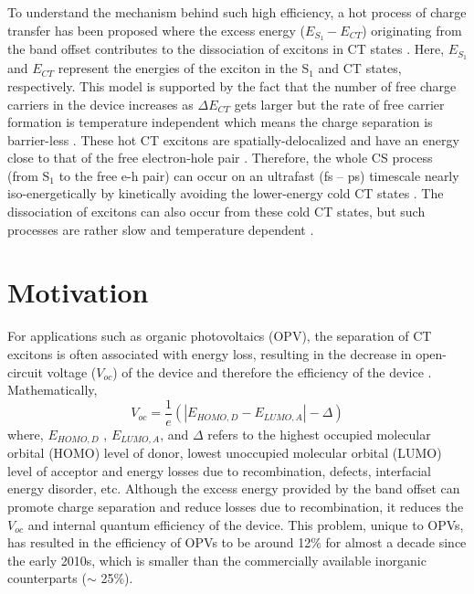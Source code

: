 \documentclass[12pt]{article}
\begin{document}
To understand the mechanism behind such high efficiency, a hot process of charge transfer has been proposed where the excess energy ($E_{S_1} - E_{CT}$) originating from the band offset contributes to the dissociation of excitons in CT states \cite{clarke2010charge}. Here, $E_{S_1}$ and $E_{CT}$ represent the energies of the exciton in the S$_1$ and CT states, respectively. This model is supported by the fact that the number of free charge
carriers in the device increases as $\Delta E_{CT}$ gets larger but the rate of free carrier formation is temperature independent which means the charge separation is barrier-less \cite{ohkita2008charge,clarke2008free,pensack2009barrierless}. These 
 hot CT excitons are spatially-delocalized and have an energy close to that of the free electron-hole pair \cite{grancini2013hot,jailaubekov2013hot,gelinas2014ultrafast,savoie2014unequal}. Therefore, the whole CS process (from S$_1$ to the free e-h pair) can occur on an ultrafast (fs – ps) 
 timescale nearly iso-energetically by kinetically avoiding the lower-energy cold CT states \cite{grancini2013hot,jailaubekov2013hot,gelinas2014ultrafast,savoie2014unequal}. The dissociation of excitons can also occur from these cold CT states, but such processes are rather slow and temperature dependent \cite{bernede2008organic,gautam2016charge,athanasopoulos2017efficient,fazzi2017hot}.


\section{Motivation}
For applications such as organic photovoltaics (OPV), the separation of CT excitons is often associated with energy loss, resulting in the decrease in open-circuit voltage ($V_{oc}$) of the device and therefore the efficiency of the device \cite{yao2015quantifying,rand2007offset,liu2019engineering}. Mathematically, 
\begin{equation}
   V_{oc} = \frac{1}{e}( |E_{HOMO,D} - E_{LUMO,A}| - \Delta)
\end{equation}
 where, $E_{HOMO,D}$ , $E_{LUMO,A}$, and $\Delta$ refers to the highest occupied molecular orbital (HOMO) level of donor, lowest unoccupied molecular orbital (LUMO) level of acceptor and energy losses due to recombination, defects, interfacial energy disorder, etc. Although the excess energy provided by the band offset can promote charge separation and reduce losses due to recombination, it reduces the $V_{oc}$ and internal quantum efficiency of the device. This problem, unique to OPVs, has resulted in the efficiency of OPVs to be around 12\% for almost a decade since the early 2010s, which is smaller than the commercially available inorganic counterparts ($\sim$ 25\%).
\end{document}
